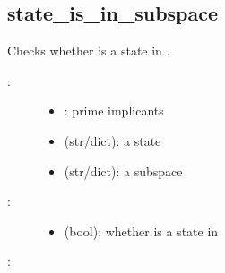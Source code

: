 \documentclass[letterpaper,10pt,english]{sphinxmanual}
\begin{document}
\subsection{state\_is\_in\_subspace}
\label{\detokenize{StateTransitionGraphs:id13}}\label{\detokenize{StateTransitionGraphs:state-is-in-subspace}}

\begin{fulllineitems}
\label{\detokenize{StateTransitionGraphs:PyBoolNet.StateTransitionGraphs.state_is_in_subspace}}
Checks whether  is a state in .
\begin{description}
\item[{:}] \leavevmode\begin{itemize}
\item {} 
: prime implicants

\item {} 
 (str/dict): a state

\item {} 
 (str/dict): a subspace

\end{itemize}

\item[{:}] \leavevmode\begin{itemize}
\item {} 
 (bool): whether  is a state in 

\end{itemize}

\end{description}

:

\begin{sphinxVerbatim}[commandchars=\\\{\}]
  
\end{sphinxVerbatim}

\end{fulllineitems}
\end{document}
